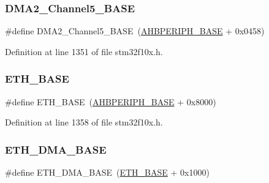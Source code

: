 \subsubsection{\texorpdfstring{D\+M\+A2\+\_\+\+Channel5\+\_\+\+B\+A\+SE}{DMA2\_Channel5\_BASE}}
{\footnotesize\ttfamily \#define D\+M\+A2\+\_\+\+Channel5\+\_\+\+B\+A\+SE~(\hyperlink{group___peripheral__memory__map_ga92eb5d49730765d2abd0f5b09548f9f5}{A\+H\+B\+P\+E\+R\+I\+P\+H\+\_\+\+B\+A\+SE} + 0x0458)}



Definition at line 1351 of file stm32f10x.\+h.

\mbox{\label{group___peripheral__memory__map_gad965a7b1106ece575ed3da10c45c65cc}} 
\subsubsection{\texorpdfstring{E\+T\+H\+\_\+\+B\+A\+SE}{ETH\_BASE}}
{\footnotesize\ttfamily \#define E\+T\+H\+\_\+\+B\+A\+SE~(\hyperlink{group___peripheral__memory__map_ga92eb5d49730765d2abd0f5b09548f9f5}{A\+H\+B\+P\+E\+R\+I\+P\+H\+\_\+\+B\+A\+SE} + 0x8000)}



Definition at line 1358 of file stm32f10x.\+h.

\mbox{\label{group___peripheral__memory__map_gace2114e1b37c1ba88d60f3e831b67e93}} 
\subsubsection{\texorpdfstring{E\+T\+H\+\_\+\+D\+M\+A\+\_\+\+B\+A\+SE}{ETH\_DMA\_BASE}}
{\footnotesize\ttfamily \#define E\+T\+H\+\_\+\+D\+M\+A\+\_\+\+B\+A\+SE~(\hyperlink{group___peripheral__memory__map_gad965a7b1106ece575ed3da10c45c65cc}{E\+T\+H\+\_\+\+B\+A\+SE} + 0x1000)}



